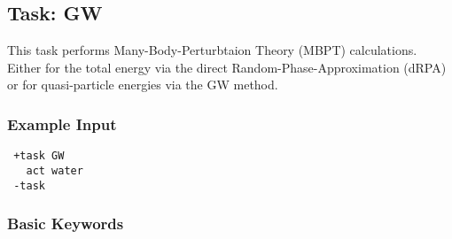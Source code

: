 \subsection{Task: GW}
This task performs Many-Body-Perturbtaion Theory (MBPT) calculations. Either for the total energy via the direct Random-Phase-Approximation (dRPA) or for quasi-particle energies via the GW method. 
\subsubsection{Example Input}
\begin{lstlisting}
 +task GW
   act water
 -task
\end{lstlisting}
\subsubsection{Basic Keywords}
